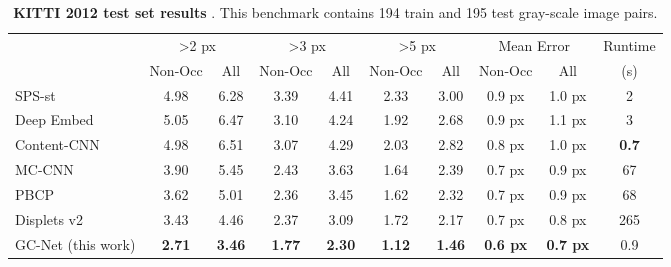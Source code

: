 \documentclass[10pt,twocolumn,letterpaper]{article}
\begin{document}
\begin{table*}[t]
\centering
\begin{subtable}[t]{\linewidth}
\centering
\begin{tabular}{l|cc|cc|cc|cc|c} \hline
& \multicolumn{2}{c|}{\textgreater 2 px} & \multicolumn{2}{c|}{\textgreater3 px} & \multicolumn{2}{c|}{\textgreater 5 px} & \multicolumn{2}{c|}{Mean Error} & Runtime \\
& Non-Occ & All & Non-Occ & All & Non-Occ & All & Non-Occ & All & (s) \\ \hline \hline
SPS-st \cite{yamaguchi2014efficient}  		& 4.98 & 6.28 & 3.39 & 4.41 & 2.33 & 3.00 & 0.9 px & 1.0 px & 2 \\
Deep Embed \cite{chen2015deep} 				& 5.05 & 6.47 & 3.10 & 4.24 & 1.92 & 2.68 & 0.9 px & 1.1 px & 3 \\
Content-CNN \cite{luo2016efficient}  		& 4.98 & 6.51 & 3.07 & 4.29 & 2.03 & 2.82 & 0.8 px & 1.0 px & \textbf{0.7} \\ 
MC-CNN \cite{zbontar2016stereo} 			& 3.90 & 5.45 & 2.43 & 3.63 & 1.64 & 2.39 & 0.7 px & 0.9 px & 67 \\
PBCP \cite{Seki2016BMVC} 					& 3.62 & 5.01 & 2.36 & 3.45 & 1.62 & 2.32 & 0.7 px & 0.9 px & 68 \\
Displets v2 \cite{guney2015displets} 		& 3.43 & 4.46 & 2.37 & 3.09 & 1.72 & 2.17 & 0.7 px & 0.8 px & 265 \\ \hline
GC-Net (this work)           				& \textbf{2.71} & \textbf{3.46} & \textbf{1.77} & \textbf{2.30} & \textbf{1.12} & \textbf{1.46} & \textbf{0.6 px} & \textbf{0.7 px} & 0.9 \\
\end{tabular}
	\caption{\textbf{KITTI 2012 test set results} \cite{Geiger2012CVPR}. This benchmark contains 194 train and 195 test gray-scale image pairs.}
	\label{tbl:kitti2012}
\end{subtable}

\vspace{5 mm}


\end{table*}
\end{document}
